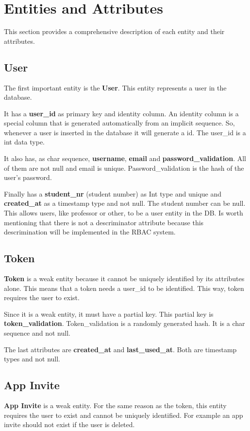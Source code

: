 \documentclass[a4paper,twoside,11pt]{article}
\begin{document}
\section*{Entities and Attributes}
This section provides a comprehensive description of each entity and their attributes.
\subsection*{User}
The first important entity is the \textbf{User}. This entity represents a user in the database.

It has a \textbf{user\_id} as primary key and identity column. An identity column is a special column that is generated automatically from an implicit sequence.
So, whenever a user is inserted in the database it will generate a id. The user\_id is a int data type. 

It also has, as char sequence, \textbf{username}, \textbf{email} and \textbf{password\_validation}. All of them are not null and email is unique. Password\_validation is the hash of the user's password.

Finally has a \textbf{student\_nr} (student number) as Int type and unique and \textbf{created\_at} as a timestamp type and not null.
The student number can be null. This allows users, like professor or other, to be a user entity in the DB. Is worth mentioning that there is not a descriminator attribute because 
this descrimination will be implemented in the RBAC system.

\subsection*{Token}
\textbf{Token} is a weak entity because it cannot be uniquely identified by its attributes alone. This means that a token needs a user\_id to be identified. This way, token requires the user to exist.

Since it is a weak entity, it must have a partial key. This partial key is \textbf{token\_validation}. Token\_validation is a randomly generated hash. It is a char sequence and not null.

The last attributes are \textbf{created\_at} and \textbf{last\_used\_at}. Both are timestamp types and not null. 

\subsection*{App Invite}
\textbf{App Invite} is a weak entity. For the same reason as the token, this entity requires the user to exist and cannot be uniquely identified. For example an app invite should not exist if the user is deleted.
\end{document}
